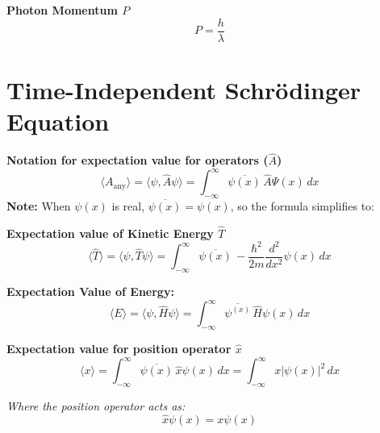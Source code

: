 \documentclass[a4paper,11pt]{article}
\renewcommand{\textbf}[1]{{\scriptsize	\bfseries #1}}
\begin{document}
\begin{footnotesize}
\begin{multicols}{2}
\begin{minipage}{\linewidth}

\textbf{Photon Momentum $P$} \\[-0.2cm]
\[
P = \frac{h}{\lambda}
\]

\end{minipage}




\section*{Time-Independent Schrödinger Equation}

\begin{minipage}{\linewidth}

\textbf{Notation for expectation value for operators ($\hat{A}$)}
\[
\langle A_{\text{any}} \rangle = \langle \psi, \hat{A} \psi \rangle = \int_{-\infty}^{\infty} \overline{\psi(x)}\, \hat{A} \Psi(x) \, dx
\]
\textbf{Note:} When \(\psi(x)\) is real, \(\overline{\psi(x)} = \psi(x)\), so the formula simplifies to:
\end{minipage}


\begin{minipage}{\linewidth}

\textbf{Expectation value of Kinetic Energy $\hat{T}$}
\[
\langle \hat{T} \rangle = \langle \psi, \hat{T} \psi \rangle = \int_{-\infty}^{\infty} \overline{\psi(x)} \, -\frac{\hbar^2}{2m} \frac{d^2}{dx^2} \psi(x) \, dx
\]

\end{minipage}
\begin{minipage}{\linewidth}

\textbf{Expectation Value of Energy:} \\[-0.2cm]
\[
\langle E \rangle= \langle \psi, \hat{H} \psi \rangle = \int_{-\infty}^{\infty} \overline{\psi^(x)} \, \hat{H} \psi(x) \, dx 
\]

\end{minipage}
\begin{minipage}{\linewidth}

\textbf{Expectation value for position operator $\hat{x}$}
\[
\langle x \rangle = \int_{-\infty}^{\infty} \overline{\psi(x)} \, \hat{x} \psi(x) \, dx = \int_{-\infty}^{\infty} x |\psi(x)|^2 \, dx
\]

\textit{Where the position operator acts as:}
\[
\hat{x} \psi(x) = x \psi(x)
\]

\end{minipage}
\begin{minipage}{\linewidth}


\end{minipage}
\end{multicols}
\end{footnotesize}
\end{document}
